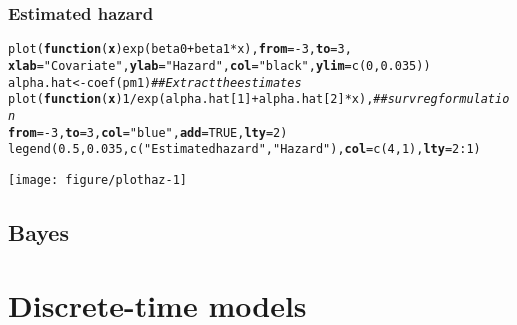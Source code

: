\documentclass[color=usenames,dvipsnames]{beamer}\usepackage[]{graphicx}\usepackage[]{color}
\makeatletter
\newcommand{\hlnum}[1]{\textcolor[rgb]{0.69,0.494,0}{#1}}%
\newcommand{\hlstr}[1]{\textcolor[rgb]{0.749,0.012,0.012}{#1}}%
\newcommand{\hlcom}[1]{\textcolor[rgb]{0.514,0.506,0.514}{\textit{#1}}}%
\newcommand{\hlopt}[1]{\textcolor[rgb]{0,0,0}{#1}}%
\newcommand{\hlstd}[1]{\textcolor[rgb]{0,0,0}{#1}}%
\newcommand{\hlkwa}[1]{\textcolor[rgb]{0,0,0}{\textbf{#1}}}%
\newcommand{\hlkwb}[1]{\textcolor[rgb]{0,0.341,0.682}{#1}}%
\newcommand{\hlkwc}[1]{\textcolor[rgb]{0,0,0}{\textbf{#1}}}%
\newcommand{\hlkwd}[1]{\textcolor[rgb]{0.004,0.004,0.506}{#1}}%
\newenvironment{kframe}{%
 \def\at@end@of@kframe{}%
 \ifinner\ifhmode%
  \def\at@end@of@kframe{\end{minipage}}%
  \begin{minipage}{\columnwidth}%
 \fi\fi%
 \def\FrameCommand##1{\hskip\@totalleftmargin \hskip-\fboxsep
 \colorbox{shadecolor}{##1}\hskip-\fboxsep
     \hskip-\linewidth \hskip-\@totalleftmargin \hskip\columnwidth}%
 \MakeFramed {\advance\hsize-\width
   \@totalleftmargin\z@ \linewidth\hsize
   \@setminipage}}%
 {\par\unskip\endMakeFramed%
 \at@end@of@kframe}
\newenvironment{knitrout}{}{} %
\makeatother
\begin{document}
\begin{frame}[fragile]
  \frametitle{Estimated hazard}
\begin{knitrout}\scriptsize
{}\color{fgcolor}\begin{kframe}
\begin{alltt}
\hlkwd{plot}\hlstd{(}\hlkwa{function}\hlstd{(}\hlkwc{x}\hlstd{)} \hlkwd{exp}\hlstd{(beta0} \hlopt{+} \hlstd{beta1}\hlopt{*}\hlstd{x),} \hlkwc{from}\hlstd{=}\hlopt{-}\hlnum{3}\hlstd{,} \hlkwc{to}\hlstd{=}\hlnum{3}\hlstd{,}
     \hlkwc{xlab}\hlstd{=}\hlstr{"Covariate"}\hlstd{,} \hlkwc{ylab}\hlstd{=}\hlstr{"Hazard"}\hlstd{,} \hlkwc{col}\hlstd{=}\hlstr{"black"}\hlstd{,} \hlkwc{ylim}\hlstd{=}\hlkwd{c}\hlstd{(}\hlnum{0}\hlstd{,} \hlnum{0.035}\hlstd{))}
\hlstd{alpha.hat} \hlkwb{<-} \hlkwd{coef}\hlstd{(pm1)}   \hlcom{## Extract the estimates}
\hlkwd{plot}\hlstd{(}\hlkwa{function}\hlstd{(}\hlkwc{x}\hlstd{)} \hlnum{1}\hlopt{/}\hlkwd{exp}\hlstd{(alpha.hat[}\hlnum{1}\hlstd{]} \hlopt{+} \hlstd{alpha.hat[}\hlnum{2}\hlstd{]}\hlopt{*}\hlstd{x),} \hlcom{## survreg formulation}
     \hlkwc{from}\hlstd{=}\hlopt{-}\hlnum{3}\hlstd{,} \hlkwc{to}\hlstd{=}\hlnum{3}\hlstd{,} \hlkwc{col}\hlstd{=}\hlstr{"blue"}\hlstd{,} \hlkwc{add}\hlstd{=}\hlnum{TRUE}\hlstd{,} \hlkwc{lty}\hlstd{=}\hlnum{2}\hlstd{)}
\hlkwd{legend}\hlstd{(}\hlnum{0.5}\hlstd{,} \hlnum{0.035}\hlstd{,} \hlkwd{c}\hlstd{(}\hlstr{"Estimated hazard"}\hlstd{,} \hlstr{"Hazard"}\hlstd{),} \hlkwc{col}\hlstd{=}\hlkwd{c}\hlstd{(}\hlnum{4}\hlstd{,}\hlnum{1}\hlstd{),} \hlkwc{lty}\hlstd{=}\hlnum{2}\hlopt{:}\hlnum{1}\hlstd{)}
\end{alltt}
\end{kframe}

{\centering \texttt{[image: figure/plothaz-1]} 

}


\end{knitrout}
\end{frame}





\subsection{Bayes}






\section{Discrete-time models}
\end{document}
